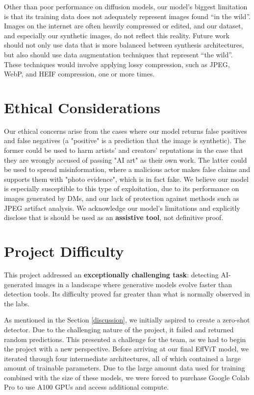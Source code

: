 \documentclass{article} %
\begin{document}
Other than poor performance on diffusion models, our model's biggest limitation is that its training data does not adequately represent images found ``in the wild''. Images on the internet are often heavily compressed or edited, and our dataset, and especially our synthetic images, do not reflect this reality. Future work should not only use data that is more balanced between synthesis architectures, but also should use data augmentation techniques that represent ``the wild''. These techniques would involve applying lossy compression, such as JPEG, WebP, and HEIF compression, one or more times.

\section{Ethical Considerations}

Our ethical concerns arise from the cases where our model returns false positives and false negatives (a "positive" is a prediction that the image is synthetic). The former could be used to harm artists' and creators' reputations in the case that they are wrongly accused of passing "AI art" as their own work. The latter could be used to spread misinformation, where a malicious actor makes false claims and supports them with "photo evidence", which is in fact fake. We believe our model is especially susceptible to this type of exploitation, due to its performance on images generated by DMs, and our lack of protection against methods such as JPEG artifact analysis. We acknowledge our model's limitations and explicitly disclose that is should be used as an \textbf{assistive tool}, not definitive proof.

\section{Project Difficulty}

This project addressed an \textbf{exceptionally challenging task}: detecting AI-generated images in a landscape where generative models evolve faster than detection tools. Its difficulty proved far greater than what is normally observed in the labs.

As mentioned in the Section \ref{discussion}, we initially aspired to create a zero-shot detector. Due to the challenging nature of the project, it failed and returned random predictions. This presented a challenge for the team, as we had to begin the project with a new perspective. Before arriving at our final EffViT model, we iterated through four intermediate architectures, all of which contained a large amount of trainable parameters. Due to the large amount data used for training combined with the size of these models, we were forced to purchase Google Colab Pro to use A100 GPUs and access additional compute.
\end{document}
